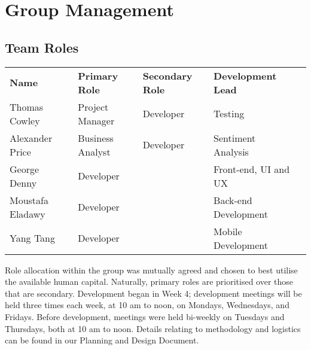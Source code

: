 \documentclass[9pt, titlepage]{extarticle}
\begin{document}
\section{Group Management}

\subsection*{Team Roles}
\vspace*{1mm}\hline\vspace*{1mm}
\begin{center}
\begin{tabular}{lllll}
    \textbf{Name}   & \textbf{Primary Role} & \textbf{Secondary Role}   & \textbf{Development Lead}\\
    Thomas Cowley   & Project Manager       &Developer                  & Testing\\
    Alexander Price & Business Analyst      &Developer                  & Sentiment Analysis\\ %
    George Denny    & Developer                                         && Front-end, UI and UX\\
    Moustafa Eladawy& Developer                                         && Back-end Development\\
    Yang Tang       & Developer                                         && Mobile Development\\ %
\end{tabular}
\end{center}
\vspace*{-2mm}
\hline
\vspace*{1em}

Role allocation within the group was mutually agreed and chosen to best utilise the available human capital. Naturally, primary roles are prioritised over those that are secondary. Development began in Week 4; development meetings will be held three times each week, at 10 am to noon, on Mondays, Wednesdays, and Fridays. Before development, meetings were held bi-weekly on Tuesdays and Thursdays, both at 10 am to noon. Details relating to methodology and logistics can be found in our Planning and Design Document.

\printbibliography[heading=bibintoc]
\end{document}
